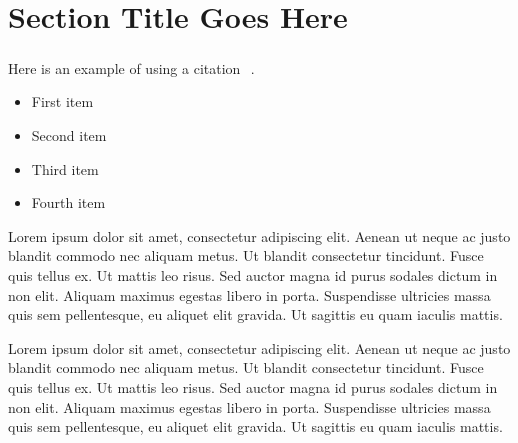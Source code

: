 \documentclass{csmagazine}
\begin{document}
\section*{Section Title Goes Here}

Here is an example of using a citation \textsuperscript{~\cite{Niu:2018ejh}}.

\begin{itemize}
	\item First item
	\item Second item
	\item Third item
	\item Fourth item
\end{itemize}

Lorem ipsum dolor sit amet, consectetur adipiscing elit. Aenean ut neque ac justo blandit commodo nec aliquam metus. Ut blandit consectetur tincidunt. Fusce quis tellus ex. Ut mattis leo risus. Sed auctor magna id purus sodales dictum in non elit. Aliquam maximus egestas libero in porta. Suspendisse ultricies massa quis sem pellentesque, eu aliquet elit gravida. Ut sagittis eu quam iaculis mattis.

Lorem ipsum dolor sit amet, consectetur adipiscing elit. Aenean ut neque ac justo blandit commodo nec aliquam metus. Ut blandit consectetur tincidunt. Fusce quis tellus ex. Ut mattis leo risus. Sed auctor magna id purus sodales dictum in non elit. Aliquam maximus egestas libero in porta. Suspendisse ultricies massa quis sem pellentesque, eu aliquet elit gravida. Ut sagittis eu quam iaculis mattis.











\end{document}
